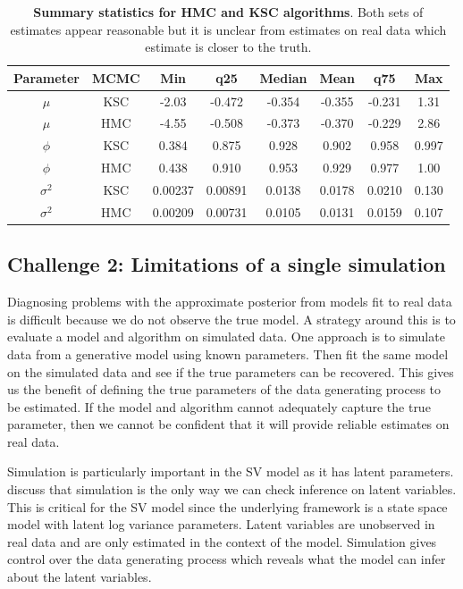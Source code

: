 \documentclass[12pt, a4paper]{article}
\begin{document}
    \begin{table}[H]
        \centering
        \begin{tabular}{|c|c|c|c|c|c|c|c|} \hline 
        Parameter&  MCMC&Min& q25&  Median& Mean & q75&Max\\ \hline 
        $\mu$&  KSC&-2.03 & -0.472 & -0.354 & -0.355 & -0.231 & 1.31 \\
     $\mu$&  HMC&-4.55 & -0.508 & -0.373 & -0.370 & -0.229 &2.86  \\\hline 
     $\phi$&  KSC&0.384 & 0.875 & 0.928 & 0.902 & 0.958 & 0.997 \\
     $\phi$&  HMC&0.438 & 0.910 & 0.953 & 0.929 & 0.977 &1.00  \\ \hline 
     $\sigma^2$&  KSC&0.00237 & 0.00891 & 0.0138 & 0.0178 & 0.0210 & 0.130 \\ 
     $\sigma^2$&  HMC&0.00209 & 0.00731 & 0.0105 & 0.0131 & 0.0159 &0.107 \\ \hline
        \end{tabular}
        \caption{\textbf{Summary statistics for HMC and KSC algorithms}. Both sets of estimates appear reasonable but it is unclear from estimates on real data which estimate is closer to the truth.}
        \label{tab:realdata}
    \end{table}
    
\subsection{Challenge 2: Limitations of a single simulation}
    Diagnosing problems with the approximate posterior from models fit to real data is difficult because we do not observe the true model. A strategy around this is to evaluate a model and algorithm on simulated data. One approach is to simulate data from a generative model using known parameters. Then fit the same model on the simulated data and see if the true parameters can be recovered. This gives us the benefit of defining the true parameters of the data generating process to be estimated. If the model and algorithm cannot adequately capture the true parameter, then we cannot be confident that it will provide reliable estimates on real data.

    Simulation is particularly important in the SV model as it has latent parameters. \citet{gelman2020bayesian} discuss that simulation is the only way we can check inference on latent variables. This is critical for the SV model since the underlying framework is a state space model with latent log variance parameters. Latent variables are unobserved in real data and are only estimated in the context of the model. Simulation gives control over the data generating process which reveals what the model can infer about the latent variables. 
\end{document}
